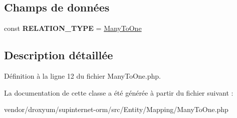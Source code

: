 \subsection*{Champs de données}
\begin{DoxyCompactItemize}
\item 
const {\bfseries R\+E\+L\+A\+T\+I\+O\+N\+\_\+\+T\+Y\+PE} = \textquotesingle{}\hyperlink{class_o_r_m_1_1_entity_1_1_mapping_1_1_many_to_one}{Many\+To\+One}\textquotesingle{}\hypertarget{class_o_r_m_1_1_entity_1_1_mapping_1_1_many_to_one_ad16269a86deb3ce513fae9cc83cdf8d5}{}\label{class_o_r_m_1_1_entity_1_1_mapping_1_1_many_to_one_ad16269a86deb3ce513fae9cc83cdf8d5}

\end{DoxyCompactItemize}


\subsection{Description détaillée}


Définition à la ligne 12 du fichier Many\+To\+One.\+php.



La documentation de cette classe a été générée à partir du fichier suivant \+:\begin{DoxyCompactItemize}
\item 
vendor/droxyum/supinternet-\/orm/src/\+Entity/\+Mapping/Many\+To\+One.\+php\end{DoxyCompactItemize}
